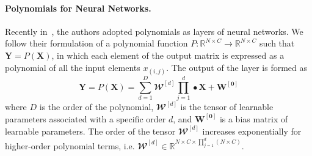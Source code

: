 \documentclass[10pt,twocolumn,letterpaper]{article}
\begin{document}
\paragraph{Polynomials for Neural Networks.}{ Recently in~\cite{chrysos2020p}, the authors adopted polynomials as layers of neural networks. We follow their formulation of a polynomial function $P\colon\mathbb{R}^{N \times C} \to \mathbb{R}^{N \times C}$ such that $\mathbf{Y}=P(\mathbf{X})$, in which each element of the output matrix is expressed as a polynomial of all the input elements $x_{(i,j)}$. The output of the layer is formed as
\begin{equation}
    \mathbf{Y} = P(\mathbf{X}) = \sum_{d=1}^{D} \mathbfcal{W}^{[d]}  \prod_{j=1}^{d}  \bullet  \mathbf{X} + \mathbf{W^{[0]}}
    \label{eqn:general_poly}
\end{equation}
where $D$ is the order of the polynomial, $\mathbfcal{W}^{[d]} $ is the tensor of learnable parameters associated with a specific order $d$, and $\mathbf{W^{[0]}}$ is a bias matrix of learnable parameters. The order of the tensor $\mathbfcal{W}^{[d]} $ increases exponentially for higher-order polynomial terms, i.e. $\mathbfcal{W}^{[d]} \in \mathbb{R}^{N \times C \times \prod_{j=1}^{d} (N\times C)}$.} 
\end{document}
